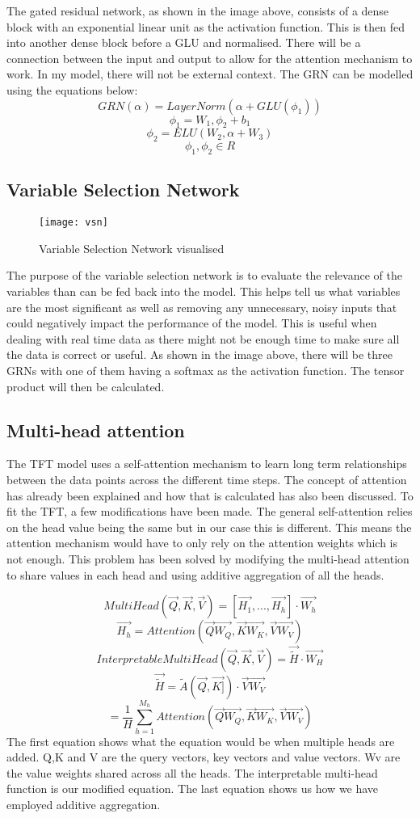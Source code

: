 \documentclass{article}
\begin{document}
The gated residual network, as shown in the image above,  consists of a dense block with an exponential linear unit as the activation function. This is then fed into another dense block before a GLU and normalised. There will be a connection between the input and output to allow for the attention mechanism to work. In my model, there will not be external context. The GRN can be modelled using the equations below:
$$GRN(\alpha) = LayerNorm(\alpha + GLU(\phi_1)) $$
$$\phi_1 = W_1, \phi_2+b_1$$
$$\phi_2 = ELU(W_2, \alpha + W_3) $$
$$\phi_1,\phi_2\in R $$

\subsection{Variable Selection Network}
\begin{figure}[h]
    \centering
    \texttt{[image: vsn]}
    \caption{Variable Selection Network visualised}
\end{figure}

The purpose of the variable selection network is to evaluate the relevance of the variables than can be fed back into the model. This helps tell us what variables are the most significant as well as removing any unnecessary, noisy inputs that could negatively impact the performance of the model. This is useful when dealing with real time data as there might not be enough time to make sure all the data is correct or useful. As shown in the image above, there will be three GRNs with one of them having a softmax as the activation function. The tensor product will then be calculated.

\subsection{Multi-head attention}
The TFT model uses a self-attention mechanism to learn long term relationships between the data points across the different time steps. The concept of attention has already been explained and how that is calculated has also been discussed. To fit the TFT, a few modifications have been made. The general self-attention relies on the head value being the same but in our case this is different. This means the attention mechanism would have to only rely on the attention weights which is not enough. This problem has been solved by modifying the multi-head attention to share values in each head and using additive aggregation of all the heads.

$$MultiHead(\vec{Q},\vec{K},\vec{V}) = [\vec{H_1},...,\vec{H_h}]\cdot\vec{W_h} $$
$$ \vec{H_h}= Attention(\vec{Q}\vec{W_Q},\vec{K}\vec{W_K},\vec{V}\vec{W_V})$$
$$InterpretableMultiHead(\vec{Q},\vec{K},\vec{V})=\vec{\tilde{H}}\cdot\vec{W_H}$$
$$ \vec{\tilde{H}}=\tilde{A}(\vec{Q},\vec{K]})\cdot\vec{V}\vec{W_V}$$
$$=\frac{1}{H}\sum _{h=1}^{M_h}Attention(\vec{Q}\vec{W_Q},\vec{K}\vec{W_K},\vec{V}\vec{W_V})$$
The first equation shows what the equation would be when multiple heads are added. Q,K and V are the query vectors, key vectors and value vectors. Wv are the value weights shared across all the heads.
The interpretable multi-head function is our modified equation. The last equation shows us how we have employed additive aggregation.
\end{document}

